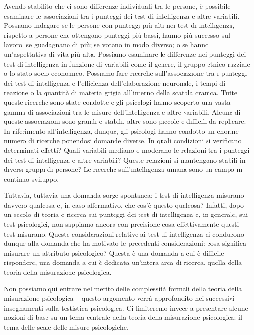 \documentclass[
]{memoir}
\theoremstyle{definition}
\theoremstyle{definition}
\theoremstyle{definition}
\theoremstyle{definition}
\theoremstyle{remark}
\begin{document}
Avendo stabilito che ci sono differenze individuali tra le persone, è possibile esaminare le associazioni tra i punteggi dei test di intelligenza e altre variabili. Possiamo indagare se le persone con punteggi più alti nei test di intelligenza, rispetto a persone che ottengono punteggi più bassi, hanno più successo sul lavoro; se guadagnano di più; se votano in modo diverso; o se hanno un'aspettativa di vita più alta. Possiamo esaminare le differenze nei punteggi dei test di intelligenza in funzione di variabili come il genere, il gruppo etnico-razziale o lo stato socio-economico. Possiamo fare ricerche sull'associazione tra i punteggi dei test di intelligenza e l'efficienza dell'elaborazione neuronale, i tempi di reazione o la quantità di materia grigia all'interno della scatola cranica. Tutte queste ricerche sono state condotte e gli psicologi hanno scoperto una vasta gamma di associazioni tra le misure dell'intelligenza e altre variabili. Alcune di queste associazioni sono grandi e stabili, altre sono piccole e difficili da replicare. In riferimento all'intelligenza, dunque, gli psicologi hanno condotto un enorme numero di ricerche ponendosi domande diverse. In quali condizioni si verificano determinati effetti? Quali variabili mediano o moderano le relazioni tra i punteggi dei test di intelligenza e altre variabili? Queste relazioni si mantengono stabili in diversi gruppi di persone? Le ricerche sull'intelligenza umana sono un campo in continuo sviluppo.

Tuttavia, tuttavia una domanda sorge spontanea: i test di intelligenza misurano davvero qualcosa e, in caso affermativo, che cos'è questo qualcosa? Infatti, dopo un secolo di teoria e ricerca sui punteggi dei test di intelligenza e, in generale, sui test psicologici, non sappiamo ancora con precisione cosa effettivamente questi test misurano.
Queste considerazioni relative ai test di intelligenza ci conducono dunque alla domanda che ha motivato le precedenti considerazioni: cosa significa misurare un attributo psicologico? Questa è una domanda a cui è difficile rispondere, una domanda a cui è dedicata un'intera area di ricerca, quella della teoria della misurazione psicologica.

Non possiamo qui entrare nel merito delle complessità formali della teoria della misurazione psicologica -- questo argomento verrà approfondito nei successivi insegnamenti sulla testistica psicologica. Ci limiteremo invece a presentare alcune nozioni di base su un tema centrale della teoria della misurazione psicologica: il tema delle scale delle misure psicologiche.
\end{document}
